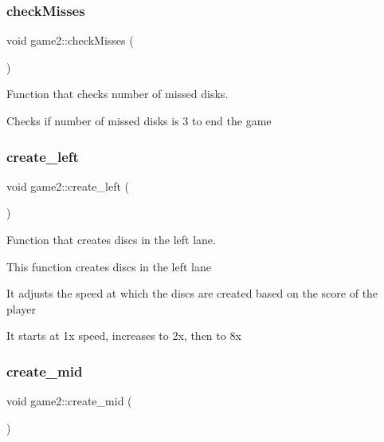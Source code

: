 \subsubsection{\texorpdfstring{check\+Misses}{checkMisses}}
{\footnotesize\ttfamily void game2\+::check\+Misses (\begin{DoxyParamCaption}{ }\end{DoxyParamCaption})\hspace{0.3cm}{\ttfamily [slot]}}



Function that checks number of missed disks. 

Checks if number of missed disks is 3 to end the game \mbox{\label{classgame2_a420782b0d5c32bf9960600a13a30c1f2}} 
\subsubsection{\texorpdfstring{create\+\_\+left}{create\_left}}
{\footnotesize\ttfamily void game2\+::create\+\_\+left (\begin{DoxyParamCaption}{ }\end{DoxyParamCaption})\hspace{0.3cm}{\ttfamily [slot]}}



Function that creates discs in the left lane. 

This function creates discs in the left lane

It adjusts the speed at which the discs are created based on the score of the player

It starts at 1x speed, increases to 2x, then to 8x \mbox{\label{classgame2_a6e5964212932ec9d08d5df31a93b3010}} 
\subsubsection{\texorpdfstring{create\+\_\+mid}{create\_mid}}
{\footnotesize\ttfamily void game2\+::create\+\_\+mid (\begin{DoxyParamCaption}{ }\end{DoxyParamCaption})\hspace{0.3cm}{\ttfamily [slot]}}



